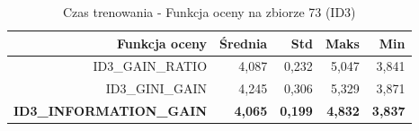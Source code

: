 \begin{table}[htbp]
\centering
\small
\setlength{\tabcolsep}{6pt}
\renewcommand{\arraystretch}{1.2}
\caption{Czas trenowania - Funkcja oceny na zbiorze 73 (ID3)}
\label{tab:ID3_eval_function_73_time}
\begin{tabular}{r|r|r|r|r}
\toprule
Funkcja oceny & Średnia & Std & Maks & Min \\
\hline
ID3\_GAIN\_RATIO & 4,087 & 0,232 & 5,047 & 3,841 \\
ID3\_GINI\_GAIN & 4,245 & 0,306 & 5,329 & 3,871 \\
\textbf{ID3\_INFORMATION\_GAIN} & \textbf{4,065} & \textbf{0,199} & \textbf{4,832} & \textbf{3,837} \\
\bottomrule
\end{tabular}
\end{table}
